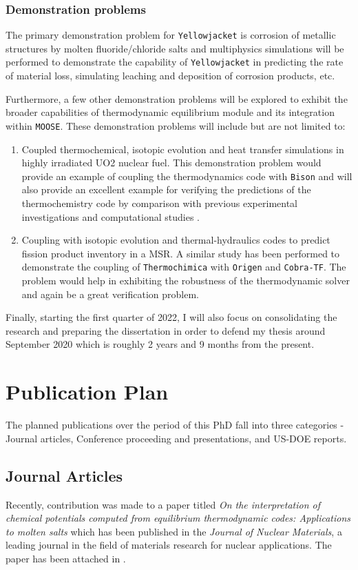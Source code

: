 	\subsubsection{Demonstration problems}
	The primary demonstration problem for \texttt{Yellowjacket} is corrosion of metallic structures by molten fluoride/chloride salts and multiphysics simulations will be performed to demonstrate the capability of \texttt{Yellowjacket} in predicting the rate of material loss, simulating leaching and deposition of corrosion products, etc.
	
	Furthermore, a few other demonstration problems will be explored to exhibit the broader capabilities of thermodynamic equilibrium module and its integration within \texttt{MOOSE}. These demonstration problems will include but are not limited to:
	\begin{enumerate}
		\item Coupled thermochemical, isotopic evolution and heat transfer simulations in highly irradiated UO2 nuclear fuel. This demonstration problem would provide an example of coupling the thermodynamics code with \texttt{Bison} and will also provide an excellent example for verifying the predictions of the thermochemistry code by comparison with previous experimental investigations \cite{Ilas11} and computational studies \cite{Piro13b}.
		\item Coupling with isotopic evolution and thermal-hydraulics codes to predict fission product inventory in a MSR. A similar study has been performed to demonstrate the coupling of \texttt{Thermochimica} with \texttt{Origen} and \texttt{Cobra-TF}. The problem would help in exhibiting the robustness of the thermodynamic solver and again be a great verification problem.
	\end{enumerate}
	
	Finally, starting the first quarter of 2022, I will also focus on consolidating the research and preparing the dissertation in order to defend my thesis around September 2020 which is roughly 2 years and 9 months from the present. 

\section{Publication Plan}
	The planned publications over the period of this PhD fall into three categories - Journal articles, Conference proceeding and presentations, and US-DOE reports. 
	
	\subsection{Journal Articles}
	Recently, contribution was made to a paper titled \emph{On the interpretation of chemical potentials computed from equilibrium thermodynamic codes: Applications to molten salts} \cite{Piro:2019aa} which has been published in the \emph{Journal of Nuclear Materials}, a leading journal in the field of materials research for nuclear applications. The paper has been attached in .
	
